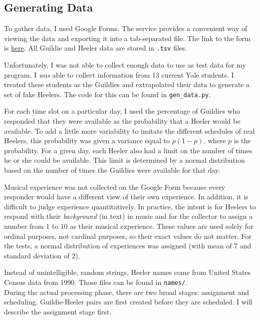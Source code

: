 \documentclass[letterpaper]{article}
\begin{document}
\subsection{Generating Data}
To gather data, I used Google Forms. The service provides a convenient way of viewing the data and exporting it into a
tab-separated file. The link to the form is
\href{https://docs.google.com/a/yale.edu/forms/d/1dGMb0QIPz002zcYsh-v1KmuDlbSm6i8hd1kqZ29O0LI/viewform?c=0&w=1}{here}.
All Guildie and Heeler data are stored in \texttt{.tsv} files.

Unfortunately, I was not able to collect enough data to use as test data for my program. I \textit{was} able to collect
information from 13 current Yale students. I treated these students as the Guildies and extrapolated their data to
generate a set of fake Heelers. The code for this can be found in \texttt{gen\_data.py}.

For each time slot on a particular day, I used the percentage of Guildies who responded that they were available as the
probability that a Heeler would be available. To add a little more variability to imitate the different schedules of
real Heelers, this probability was given a variance equal to $p(1-p)$, where $p$ is the probability. For a given day,
each Heeler also had a limit on the number of times he or she could be available. This limit is determined by a normal
distribution based on the number of times the Guildies were available for that day.

Musical experience was not collected on the Google Form because every responder would have a different view of their own
experience. In addition, it is difficult to judge experience quantitatively.
In practice, the intent is for Heelers to respond with their \textit{background} (in text) in music and for the
collector to assign a number from 1 to 10 as their musical experience. These values are used solely for ordinal
purposes, not cardinal purposes, so their exact values do not matter. For the tests, a normal distribution of
experiences was assigned (with mean of 7 and standard deviation of 2).

Instead of unintelligible, random strings, Heeler names come from United States Census data from 1990. Those files can
be found in \texttt{names/}.\\

During the actual processing phase, there are two broad stages: assignment and scheduling. Guildie-Heeler pairs are
first created before they are scheduled. I will describe the assignment stage first.
\end{document}

